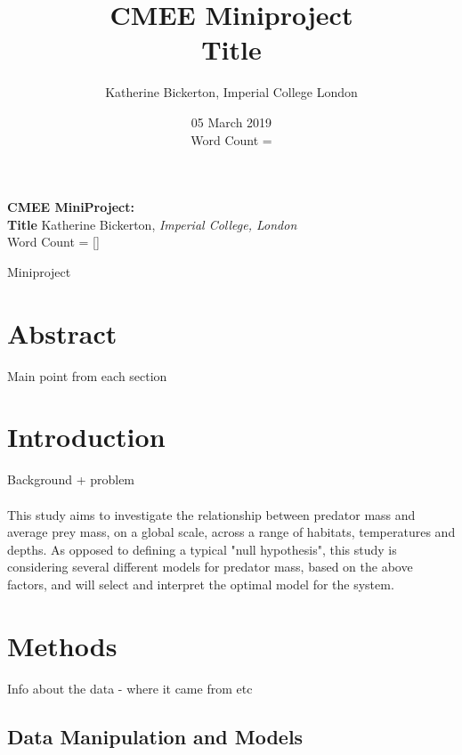 \documentclass[11pt,a4paper,titlepage]{article}
\title{CMEE Miniproject \\ Title}
\date{05 March 2019 \\Word Count =}
\author{Katherine Bickerton, Imperial College London}
\begin{document}
	
	\begin{titlepage}
		\centering
		\vspace*{\fill}
				
		{\bfseries\Large
			\vskip4cm
			CMEE MiniProject:\\
			Title
		}    
		\vskip2cm	
		\vskip2cm	
		Katherine Bickerton, \textit{Imperial College, London}\\
		\vskip1cm		
		Word Count = []
		\vspace*{\fill}
		\vspace*{\fill}
		\vspace*{\fill}
	\end{titlepage}
	
	
	\Large \noindent Miniproject
	\linenumbers
	
	\normalsize	
	\section{Abstract}
	
	Main point from each section
	
	\section{Introduction}
	
	Background + problem\\
	\\
	This study aims to investigate the relationship between predator mass and average prey mass, on a global scale, across a range of habitats, temperatures and depths. As opposed to defining a typical "null hypothesis", this study is considering several different models for predator mass, based on the above factors, and will select and interpret the optimal model for the system.
	
	
	\section{Methods}
	
	Info about the data - where it came from etc\\
	
	\subsection{Data Manipulation and Models}
	
\end{document}
